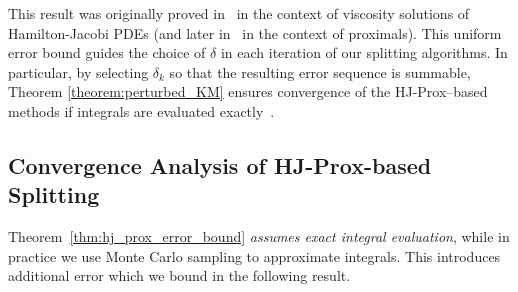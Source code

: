 \documentclass{article}
\newcommand{\Real}{\mathbb{R}}
\newcommand{\sampledhjprox}{\operatorname{\widehat{prox}}^{\delta}}
\newcommand{\prox}{\operatorname{prox}}
\newcommand{\amp}{\mathop{\:\:\,}\nolimits}
\theoremstyle{plain}
\theoremstyle{definition}
\theoremstyle{remark}
\begin{document}
This result was originally proved in~\cite{crandall1983viscosity} in the context of viscosity solutions of Hamilton-Jacobi PDEs (and later in~\cite{ZhangEtAl2024, OsherHeatonFung2023, darbon2021bayesian, darbon2023connecting} in the context of proximals).
This uniform error bound guides the choice of $\delta$ in each iteration of our splitting algorithms. In particular, by selecting $\delta_k$ so that the resulting error sequence is summable, Theorem \ref{theorem:perturbed_KM} ensures convergence of the HJ-Prox–based methods if integrals are evaluated exactly~\cite{di2025monte}.
\subsection{Convergence Analysis of HJ-Prox-based Splitting}
Theorem~\ref{thm:hj_prox_error_bound} \emph{assumes exact integral evaluation}, while in practice we use Monte Carlo sampling to approximate integrals. This introduces additional error which we bound in the  following result.
\newcommand{\ppmTheorem}[1]{ 
Let $f,g$ be proper, LSC, convex and $L$-Lipschitz.
    Consider the HJ-Prox-based PPM iteration given by 
    \begin{eqnarray}
        x_{k+1} & = & \widehat{\prox}^{\delta_k}_{t_k(f+g)}\left(x_k\right), 
    \end{eqnarray}
    with parameters satisfying 
the conditions of Assumption~\ref{assump: changeing t}.
    Then $x_k$ converges almost surely to a minimizer of $f + g$.
    }

\newcommand{\pgdTheorem}[1]{ 
Let $f,g$ be proper, LSC, convex and $L$-Lipschitz, with $f$ additionally $L'$-smooth.
    Consider the HJ-Prox-based PGD iteration given by 
    \begin{eqnarray}
        x_{k+1} & = & \widehat{\prox}^{\delta_k}_{t_kg}\left(x_k - t_k \nabla f(x_k)\right), 
    \end{eqnarray}
    with step size $0 < t_k < 1/L'$ and parameters satisfying 
the conditions of Assumption~\ref{assump: changeing t}.
    Then $x_k$ converges almost surely to a minimizer of $f + g$.
    }

\newcommand{\hjproxMCerrorTheorem}[1]{
Let $f : \Real^n \mapsto \Real$ be convex, LSC and $L$-Lipschitz. Let $\sampledhjprox_{tf}(x)$ denote the Hamilton-Jacobi approximation with finite sample size $N$ and $e(x)  = \sampledhjprox_{tf}(x) - \prox_{tf}(x)$ denote its approximation error. For $\alpha \in (0,1)$ and $N \geq \frac{8J_\star}{\alpha}$, we have the following probabilistic error bound.
    \begin{eqnarray}
P\left(\left\|e(x)\right\| > \sqrt{\frac{8J_\star M_\star}{\alpha N}} +\sqrt{nt\delta}\right) \amp \leq \amp \alpha,
    \end{eqnarray}
    where $J_\star =\exp\left(\frac{2}{\delta}L^2t\right)$ and $M_\star = nt\delta + (2\sqrt{nt\delta}+3Lt)^2$.
}
\end{document}
